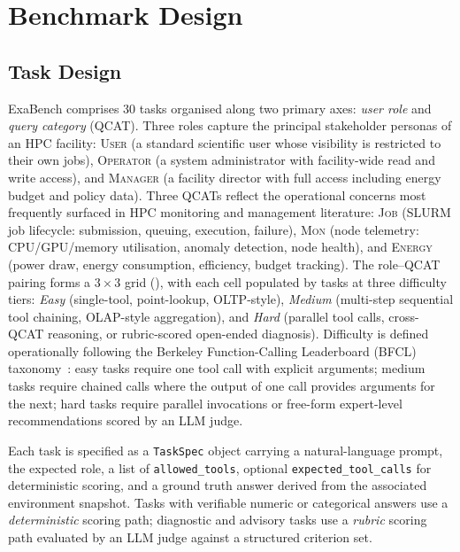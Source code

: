 \documentclass[12pt]{article}
\begin{document}
\section{Benchmark Design}
\label{sec:benchmark}

\subsection{Task Design}
\label{sec:task-design}

ExaBench comprises 30 tasks organised along two primary axes: \emph{user role} and
\emph{query category} (QCAT).  Three roles capture the principal stakeholder
personas of an HPC facility: \textsc{User} (a standard scientific user whose
visibility is restricted to their own jobs), \textsc{Operator} (a system
administrator with facility-wide read and write access), and \textsc{Manager}
(a facility director with full access including energy budget and policy data).
Three QCATs reflect the operational concerns most frequently surfaced in HPC
monitoring and management literature: \textsc{Job} (SLURM job lifecycle:
submission, queuing, execution, failure), \textsc{Mon} (node telemetry:
CPU/GPU/memory utilisation, anomaly detection, node health), and
\textsc{Energy} (power draw, energy consumption, efficiency, budget tracking).
The role--QCAT pairing forms a $3 \times 3$ grid (), with
each cell populated by tasks at three difficulty tiers: \emph{Easy}
(single-tool, point-lookup, OLTP-style), \emph{Medium} (multi-step sequential
tool chaining, OLAP-style aggregation), and \emph{Hard} (parallel tool calls,
cross-QCAT reasoning, or rubric-scored open-ended diagnosis).  Difficulty is
defined operationally following the Berkeley Function-Calling Leaderboard
(BFCL) taxonomy~\citep{bfcl2024}: easy tasks require one tool call with
explicit arguments; medium tasks require chained calls where the output of one
call provides arguments for the next; hard tasks require parallel invocations
or free-form expert-level recommendations scored by an LLM judge.

Each task is specified as a \texttt{TaskSpec} object carrying a
natural-language prompt, the expected role, a list of \texttt{allowed\_tools},
optional \texttt{expected\_tool\_calls} for deterministic scoring, and a ground
truth answer derived from the associated environment snapshot.  Tasks with
verifiable numeric or categorical answers use a \emph{deterministic} scoring
path; diagnostic and advisory tasks use a \emph{rubric} scoring path evaluated
by an LLM judge against a structured criterion set.
\end{document}
